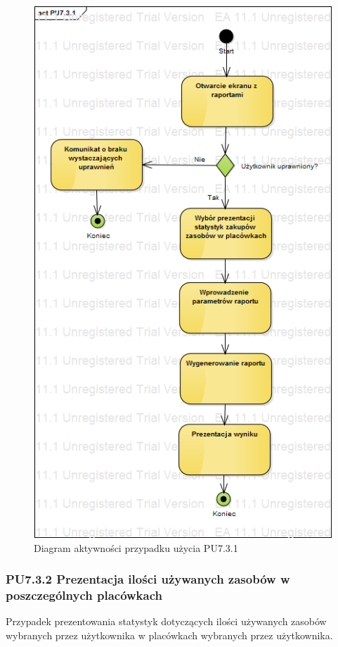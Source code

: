\begin{figure}[h!]
	\centering
	\includegraphics[scale=0.6]{img/diagrams/activityDiagrams/PU731}
	\caption{Diagram aktywności przypadku użycia PU7.3.1 \label{fig:labelADPU7.3.1}}
\end{figure}

\subsubsection{PU7.3.2 Prezentacja ilości używanych zasobów w poszczególnych placówkach}
Przypadek prezentowania statystyk dotyczących ilości używanych zasobów wybranych przez użytkownika w placówkach wybranych przez użytkownika.

